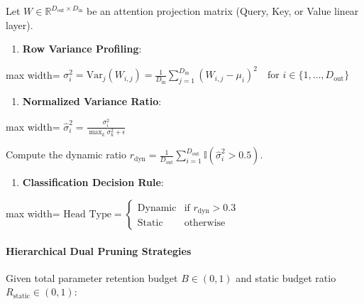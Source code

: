 Let $W \in \mathbb{R}^{D_{\text{out}} \times D_{\text{in}}}$ be an attention projection matrix (Query, Key, or Value linear layer).

\begin{enumerate}
\item \textbf{Row Variance Profiling}:
\end{enumerate}
\begin{center}
\begin{adjustbox}{max width=\columnwidth}
$\displaystyle
\sigma_i^2 = \text{Var}_j(W_{i, j}) = \frac{1}{D_{\text{in}}} \sum_{j=1}^{D_{\text{in}}} \left( W_{i, j} - \mu_i \right)^2 \quad \text{for } i \in \{1, \dots, D_{\text{out}}\}
$
\end{adjustbox}
\end{center}

\begin{enumerate}
\item \textbf{Normalized Variance Ratio}:
\end{enumerate}
\begin{center}
\begin{adjustbox}{max width=\columnwidth}
$\displaystyle
\widehat{\sigma}_i^2 = \frac{\sigma_i^2}{\max_k \sigma_k^2 + \epsilon}
$
\end{adjustbox}
\end{center}
Compute the dynamic ratio $r_{\text{dyn}} = \frac{1}{D_{\text{out}}} \sum_{i=1}^{D_{\text{out}}} \mathbb{I}(\widehat{\sigma}_i^2 > 0.5)$.

\begin{enumerate}
\item \textbf{Classification Decision Rule}:
\end{enumerate}
\begin{center}
\begin{adjustbox}{max width=\columnwidth}
$\displaystyle
\text{Head Type} = \begin{cases} \text{Dynamic} & \text{if } r_{\text{dyn}} > 0.3 \\ \text{Static} & \text{otherwise} \end{cases}
$
\end{adjustbox}
\end{center}

\paragraph{Hierarchical Dual Pruning Strategies}

Given total parameter retention budget $B \in (0, 1)$ and static budget ratio $R_{\text{static}} \in (0, 1)$:

